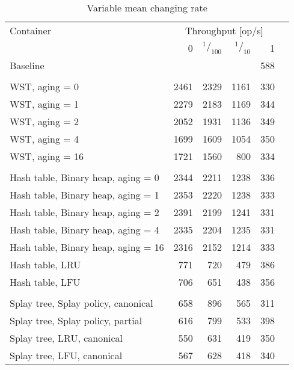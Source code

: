 \begin{table}
\caption{Variable mean changing rate}
\begin{tabular}[]{l r r r r r} \toprule
Container & \multicolumn{4}{c}{Throughput [op/s]} \\ \cmidrule(r){2-5}
& 0 & $^1/_{100}$ & $^1/_{10}$ & 1 \\ \midrule
Baseline & \multicolumn{4}{r}{588}  \\
\\
WST, aging = 0 & 2461 & 2329 & 1161 & 330 \\
WST, aging = 1 & 2279 & 2183 & 1169 & 344 \\
WST, aging = 2 & 2052 & 1931 & 1136 & 349 \\
WST, aging = 4 & 1699 & 1609 & 1054 & 350 \\
WST, aging = 16 & 1721 & 1560 & 800 & 334 \\
\\
Hash table, Binary heap, aging = 0 & 2344 & 2211 & 1238 & 336 \\
Hash table, Binary heap, aging = 1 & 2353 & 2220 & 1238 & 333 \\
Hash table, Binary heap, aging = 2 & 2391 & 2199 & 1241 & 331 \\
Hash table, Binary heap, aging = 4 & 2335 & 2204 & 1235 & 331 \\
Hash table, Binary heap, aging = 16 & 2316 & 2152 & 1214 & 333 \\
Hash table, LRU & 771 & 720 & 479 & 386 \\
Hash table, LFU & 706 & 651 & 438 & 356 \\
\\
Splay tree, Splay policy, canonical & 658 & 896 & 565 & 311 \\
Splay tree, Splay policy, partial & 616 & 799 & 533 & 398 \\
Splay tree, LRU, canonical & 550 & 631 & 419 & 350 \\
Splay tree, LFU, canonical & 567 & 628 & 418 & 340 \\
\bottomrule
\end{tabular}
\end{table}
